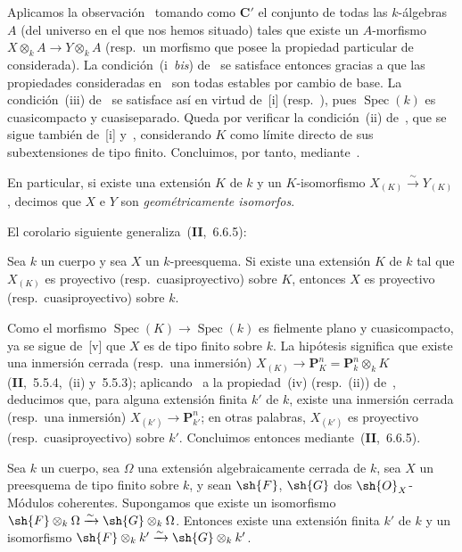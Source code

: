 Aplicamos la observación~ tomando como $\boldsymbol{C}'$ el conjunto de todas las $k$-álgebras $A$ (del universo en el que nos hemos situado) tales que existe un $A$-morfismo $X\otimes_k A\to Y\otimes_k A$ (resp.\ un morfismo que posee la propiedad particular de~ considerada).
La condición~(i~\emph{bis}) de~ se satisface entonces gracias a que las
propiedades consideradas en~ son todas estables por cambio de base.
La condición~(iii) de~ se satisface así en virtud de~[i] (resp.\ ), pues $\operatorname{Spec}(k)$ es cuasicompacto y cuasiseparado.
Queda por verificar la condición~(ii) de~, que se sigue también de~[i] y~, considerando $K$ como límite directo de sus subextensiones de tipo finito.
Concluimos, por tanto, mediante~.

En particular, si existe una extensión $K$ de $k$ y un $K$-isomorfismo $X_{(K)}\xrightarrow{\sim} Y_{(K)}$, decimos que $X$ e $Y$ son \emph{geométricamente isomorfos}.

El corolario siguiente generaliza~(\textbf{II},~6.6.5):

\begin{corollary}[9.1.5]
\label{IV.9.1.5}
Sea $k$ un cuerpo y sea $X$ un $k$-preesquema.
Si existe una extensión $K$ de $k$ tal que $X_{(K)}$ es proyectivo \textnormal{(resp.}\ cuasiproyectivo\textnormal{)} sobre $K$, entonces $X$ es proyectivo \textnormal{(resp.}\ cuasiproyectivo\textnormal{)} sobre $k$.
\end{corollary}

Como el morfismo $\operatorname{Spec}(K)\to\operatorname{Spec}(k)$ es fielmente plano y cuasicompacto, ya se sigue de~[v] que $X$ es de tipo finito sobre $k$.
La hipótesis significa que existe una inmersión cerrada (resp.\ una inmersión) $X_{(K)}\to\mathbf{P}_K^n=\mathbf{P}_k^n\otimes_k K$ (\textbf{II},~5.5.4,~(ii) y~5.5.3); aplicando~ a la propiedad~(iv) (resp.~(ii)) de~, deducimos que, para alguna extensión finita $k'$ de $k$, existe una inmersión cerrada (resp.\ una inmersión) $X_{(k')}\to\mathbf{P}_{k'}^n$; en otras palabras, $X_{(k')}$ es proyectivo (resp.\ cuasiproyectivo) sobre $k'$.
Concluimos entonces mediante~(\textbf{II},~6.6.5).

\begin{proposition}[9.1.6]
\label{IV.9.1.6}
Sea $k$ un cuerpo, sea $\Omega$ una extensión algebraicamente cerrada de $k$, sea $X$ un preesquema de tipo finito sobre $k$, y sean $\sh{F}$, $\sh{G}$ dos $\sh{O}_X$-Módulos coherentes.
Supongamos que existe un isomorfismo $\sh{F}\otimes_k\Omega\xrightarrow{\sim}\sh{G}\otimes_k\Omega$.
Entonces existe una extensión finita $k'$ de $k$ y un isomorfismo $\sh{F}\otimes_k k'\xrightarrow{\sim}\sh{G}\otimes_k k'$.
\end{proposition}

